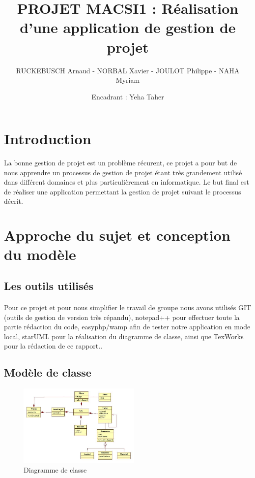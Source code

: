 \documentclass[a4paper, 12pt]{article}
\title{PROJET MACSI1 : Réalisation d'une application de gestion de projet }
\author{RUCKEBUSCH Arnaud - NORBAL Xavier - JOULOT Philippe - NAHA Myriam}
\date{Encadrant : Yeha Taher}
\makeatletter
\def\maketitle{
  \null
  \thispagestyle{empty}
  \vfill
  \begin{center}\leavevmode
    \normalfont
    {\LARGE \@title\par}
    \vskip 1cm
    {\Large \@author\par}
    \vskip 1cm
    {\Large \@date\par}
  \end{center}
  \vfill
  \null
  \cleardoublepage
  }
\makeatother
\begin{document}
\maketitle
\setcounter{page}{1}
\tableofcontents
\newpage



\section{Introduction}
\paragraph{}La bonne gestion de projet est un problème récurent, ce projet a pour but de nous apprendre un processus de gestion de projet étant très grandement utilisé dans différent domaines et plus particulièrement en informatique. Le but final est de réaliser une application permettant la gestion de projet suivant le processus décrit.

\newpage

\section{Approche du sujet et conception du modèle}

\subsection{Les outils utilisés}
\paragraph{}Pour ce projet et pour nous simplifier le travail de groupe nous avons utilisés GIT (outils de gestion de version très répandu), notepad++ pour effectuer toute la partie rédaction du code, easyphp/wamp afin de tester notre application en mode local, starUML pour la réalisation du diagramme de classe, ainsi que TexWorks pour la rédaction de ce rapport..

\subsection{Modèle de classe}

\begin{figure}[h!]
	\includegraphics[height=4cm]{diagramme_de_classe.jpg}
	\caption{Diagramme de classe}
\end{figure}
\end{document}
